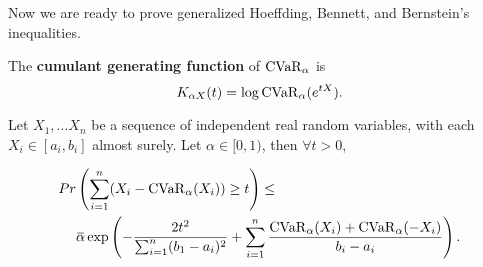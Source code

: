 Now we are ready to prove generalized Hoeffding, Bennett, and Bernstein's inequalities.

\begin{defn}
	The \textbf{cumulant generating function} of $\operatorname{CVaR}_\alpha$ is 
	\begin{equation}
		K_{\alpha X}(t) = \log{\ensuremath{\operatorname{CVaR}_\alpha}(e^{tX})}.
	\end{equation}
\end{defn}

\begin{prop}\label{prop:hoeffding}
Let $X_1, ... X_n$ be a sequence of independent real random variables, with each $X_i \in [a_i, b_i]$ almost surely. Let $\alpha \in [0, 1)$, then $\forall t > 0$, 

\begin{equation}
\begin{aligned}
	Pr &\left(\sumn (X_i - \Ca(X_i)) \ge t\right) \le \\ &{\overbar{\alpha}} \exp\left(-\frac{2t^2}{\sumn (b_1 - a_i)^2} + \sumn \frac{\Ca(X_i) + \Ca(-X_i)}{b_i - a_i}\right).
\end{aligned}
\end{equation}
\end{prop}
